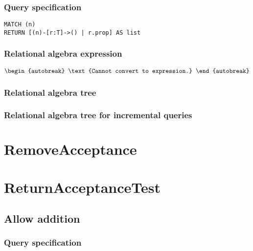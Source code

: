 \subsubsection*{Query specification}

\begin{lstlisting}
MATCH (n)
RETURN [(n)-[r:T]->() | r.prop] AS list
\end{lstlisting}

\subsubsection*{Relational algebra expression}

\begin{align*}
\begin{autobreak}
\text{Cannot convert to expression.}
\end{autobreak}
\end{align*}

\subsubsection*{Relational algebra tree}


\subsubsection*{Relational algebra tree for incremental queries}

\section{RemoveAcceptance}

\section{ReturnAcceptanceTest}


\subsection{Allow addition}

\subsubsection*{Query specification}

